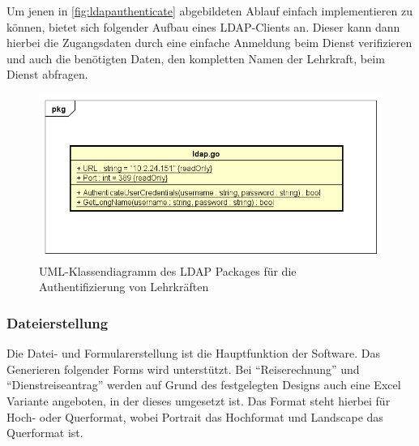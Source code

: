 \newpage

Um jenen in \autoref{fig:ldapauthenticate} abgebildeten Ablauf einfach implementieren zu können, bietet sich folgender Aufbau eines LDAP-Clients an. Dieser kann dann hierbei die Zugangsdaten durch eine einfache Anmeldung beim Dienst verifizieren und auch die benötigten Daten, den kompletten Namen der Lehrkraft, beim Dienst abfragen.

\begin{figure}[H]
	\centering
	\includegraphics[width=\linewidth]{images/mbeier_konzept/LDAP}
	\caption[lLDAP UML-Klassendiagramm]{UML-Klassendiagramm des LDAP Packages für die Authentifizierung von Lehrkräften}
	\label{fig:ldap}
\end{figure}

\newpage

\subsubsection{Dateierstellung}

Die Datei- und Formularerstellung ist die Hauptfunktion der Software. Das Generieren folgender Forms wird unterstützt. Bei \enquote{Reiserechnung} und \enquote{Dienstreiseantrag} werden auf Grund des festgelegten Designs auch eine Excel Variante angeboten, in der dieses umgesetzt ist. Das Format steht hierbei für Hoch- oder Querformat, wobei Portrait das Hochformat und Landscape das Querformat ist.


